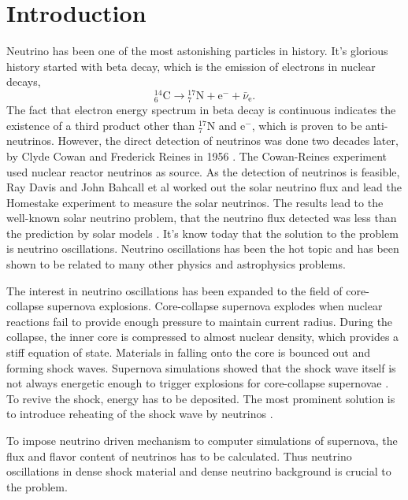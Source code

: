 \chapter{Introduction}
\label{introduction}

Neutrino has been one of the most astonishing particles in history. It's glorious history started with beta decay, which is the emission of electrons in nuclear decays,
\begin{equation*}
{}^{14}_{6} \mathrm C \to {}^{17}_{7}\mathrm N + \mathrm e^{-} + \bar\nu_{\mathrm e}.
\end{equation*}
The fact that electron energy spectrum in beta decay is continuous indicates the existence of a third product other than ${}^{17}_{7}\mathrm N$ and $\mathrm e^-$, which is proven to be anti-neutrinos. However, the direct detection of neutrinos was done two decades later, by Clyde Cowan and Frederick Reines in 1956 \cite{Cowan1956}. The Cowan-Reines experiment used nuclear reactor neutrinos as source. As the detection of neutrinos is feasible, Ray Davis and John Bahcall et al worked out the solar neutrino flux and lead the Homestake experiment to measure the solar neutrinos. The results lead to the well-known solar neutrino problem, that the neutrino flux detected was less than the prediction by solar models \cite{Bahcall1973}. It's know today that the solution to the problem is neutrino oscillations. Neutrino oscillations has been the hot topic and has been shown to be related to many other physics and astrophysics problems.

The interest in neutrino oscillations has been expanded to the field of core-collapse supernova explosions. Core-collapse supernova explodes when nuclear reactions fail to provide enough pressure to maintain current radius. During the collapse, the inner core is compressed to almost nuclear density, which provides a stiff equation of state. Materials in falling onto the core is bounced out and forming shock waves. Supernova simulations showed that the shock wave itself is not always energetic enough to trigger explosions for core-collapse supernovae \cite{Janka2016b}. To revive the shock, energy has to be deposited. The most prominent solution is to introduce reheating of the shock wave by neutrinos \cite{Janka2016b}.

To impose neutrino driven mechanism to computer simulations of supernova, the flux and flavor content of neutrinos has to be calculated. Thus neutrino oscillations in dense shock material and dense neutrino background is crucial to the problem.